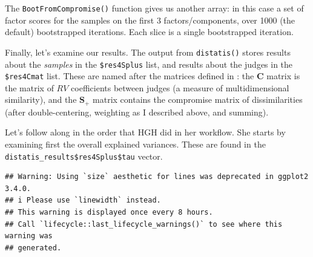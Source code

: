 \documentclass[
]{book}
\newenvironment{Shaded}{\begin{snugshade}}{\end{snugshade}}
\newcommand{\AttributeTok}[1]{\textcolor[rgb]{0.13,0.29,0.53}{#1}}
\newcommand{\ConstantTok}[1]{\textcolor[rgb]{0.56,0.35,0.01}{#1}}
\newcommand{\DecValTok}[1]{\textcolor[rgb]{0.00,0.00,0.81}{#1}}
\newcommand{\FunctionTok}[1]{\textcolor[rgb]{0.13,0.29,0.53}{\textbf{#1}}}
\newcommand{\NormalTok}[1]{#1}
\newcommand{\SpecialCharTok}[1]{\textcolor[rgb]{0.81,0.36,0.00}{\textbf{#1}}}
\newcommand{\StringTok}[1]{\textcolor[rgb]{0.31,0.60,0.02}{#1}}
\begin{document}
The \texttt{BootFromCompromise()} function gives us another array: in this case a set of factor scores for the samples on the first 3 factors/components, over 1000 (the default) bootstrapped iterations. Each slice is a single bootstrapped iteration.

Finally, let's examine our results. The output from \texttt{distatis()} stores results about the \emph{samples} in the \texttt{\$res4Splus} list, and results about the judges in the \texttt{\$res4Cmat} list. These are named after the matrices defined in \citet{abdiAnalyzing2007}: the \(\mathbf{C}\) matrix is the matrix of \(RV\) coefficients between judges (a measure of multidimensional similarity), and the \(\mathbf{S_+}\) matrix contains the compromise matrix of dissimilarities (after double-centering, weighting as I described above, and summing).

Let's follow along in the order that HGH did in her workflow. She starts by examining first the overall explained variances. These are found in the \texttt{distatis\_results\$res4Splus\$tau} vector.

\begin{Shaded}
\end{Shaded}

\begin{verbatim}
## Warning: Using `size` aesthetic for lines was deprecated in ggplot2 3.4.0.
## i Please use `linewidth` instead.
## This warning is displayed once every 8 hours.
## Call `lifecycle::last_lifecycle_warnings()` to see where this warning was
## generated.
\end{verbatim}
\end{document}
